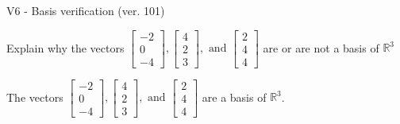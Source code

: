 \begin{exercise}
  \begin{exerciseTitle}V6 - Basis verification (ver. 101)\end{exerciseTitle}
  \begin{exerciseStatement}
    Explain why the vectors \(\left[\begin{array}{r}
-2 \\
0 \\
-4
\end{array}\right] , \left[\begin{array}{r}
4 \\
2 \\
3
\end{array}\right] , \text{ and } \left[\begin{array}{r}
2 \\
4 \\
4
\end{array}\right]\) are or are not a basis of \(\mathbb{R}^3\)	


  \end{exerciseStatement}
  \begin{exerciseAnswer}
   The vectors \(\left[\begin{array}{r}
-2 \\
0 \\
-4
\end{array}\right] , \left[\begin{array}{r}
4 \\
2 \\
3
\end{array}\right] , \text{ and } \left[\begin{array}{r}
2 \\
4 \\
4
\end{array}\right]\) 
  	 are  a basis of \(\mathbb{R}^3\).
  


  \end{exerciseAnswer}
\end{exercise}